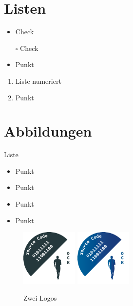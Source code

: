 \clearpage
\section*{Listen}%
	\begin{itemize}[label=\checkmark] %
		\item Check
	\end{itemize}

	\begin{itemize} 
		\item [$\square$] Check
	\end{itemize}

	\begin{itemize} 
		\item Punkt
	\end{itemize}
	\begin{enumerate} 
		\item Liste numeriert
		\item Punkt
	\end{enumerate}

\clearpage
\section*{Abbildungen}%

	Liste

	\begin{itemize} 
		\item Punkt
		\item Punkt
		\item Punkt
		\item Punkt
	\end{itemize}
			
	\begin{figure}[!h]
	\centering
	{\includegraphics[width=0.25\textwidth]{images/Logo/Logo1}}
	{\includegraphics[width=0.25\textwidth]{images/Logo/Logo2}}
	\caption{Zwei Logos}\label{Logos}
	\end{figure}

